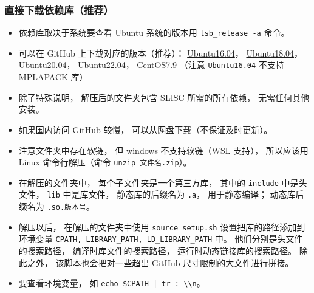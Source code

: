 \subsubsection{直接下载依赖库（推荐）}
\begin{itemize}
\item 依赖库取决于系统要查看 Ubuntu 系统的版本用 \verb|lsb_release -a| 命令。
\item 可以在 GitHub 上下载对应的版本（推荐）： \href{https://github.com/MacroUniverse/SLISC-libs-x64-ubuntu16.04}{Ubuntu16.04}， \href{https://github.com/MacroUniverse/SLISC-libs-x64-ubuntu18.04}{Ubuntu18.04}， \href{https://github.com/MacroUniverse/SLISC-libs-x64-ubuntu20.04}{Ubuntu20.04}， \href{https://github.com/MacroUniverse/SLISC-libs-x64-ubuntu22.04}{Ubuntu22.04}， \href{https://github.com/MacroUniverse/SLISC-libs-x64-centos7.9.2009}{CentOS7.9} （注意 \verb|Ubuntu16.04| 不支持 MPLAPACK 库）
\item 除了特殊说明， 解压后的文件夹包含 SLISC 所需的所有依赖， 无需任何其他安装。
\item 如果国内访问 GitHub 较慢， 可以从网盘下载（不保证及时更新）。
\item 注意文件夹中存在软链， 但 windows 不支持软链（WSL 支持）， 所以应该用 Linux 命令行解压（命令 \verb|unzip 文件名.zip|）。
\item 在解压的文件夹中， 每个子文件夹是一个第三方库， 其中的 \verb|include| 中是头文件， \verb|lib| 中是库文件， 静态库的后缀名为 \verb|.a|， 用于静态编译； 动态库后缀名为 \verb|.so.版本号|。
\item 解压以后， 在解压的文件夹中使用 \verb|source setup.sh| 设置把库的路径添加到环境变量 \verb|CPATH, LIBRARY_PATH, LD_LIBRARY_PATH| 中。 他们分别是头文件的搜索路径， 编译时库文件的搜索路径， 运行时动态链接库的搜索路径。 除此之外， 该脚本也会把对一些超出 GitHub 尺寸限制的大文件进行拼接。
\item 要查看环境变量， 如 \verb`echo $CPATH | tr : \\n`。
\end{itemize}

